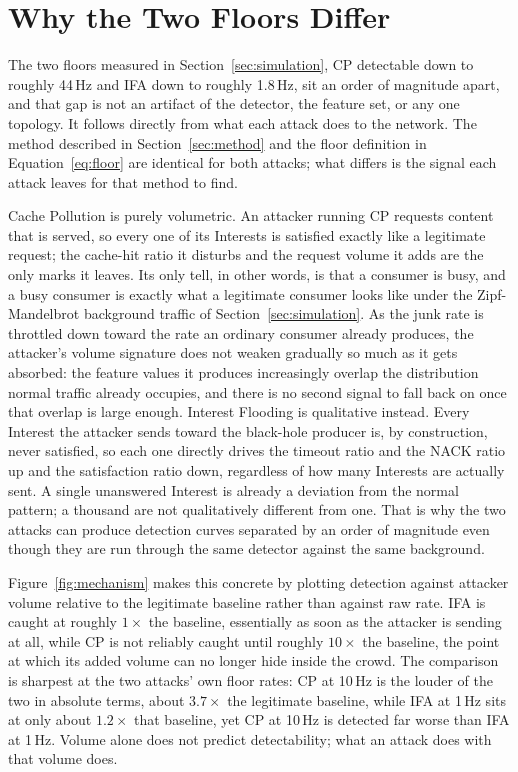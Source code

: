 \section{Why the Two Floors Differ}
\label{sec:mechanism}

The two floors measured in Section~\ref{sec:simulation}, CP detectable down to roughly 44\,Hz and IFA down to roughly 1.8\,Hz, sit an order of magnitude apart, and that gap is not an artifact of the detector, the feature set, or any one topology. It follows directly from what each attack does to the network. The method described in Section~\ref{sec:method} and the floor definition in Equation~\ref{eq:floor} are identical for both attacks; what differs is the signal each attack leaves for that method to find.

Cache Pollution is purely volumetric. An attacker running CP requests content that is served, so every one of its Interests is satisfied exactly like a legitimate request; the cache-hit ratio it disturbs and the request volume it adds are the only marks it leaves. Its only tell, in other words, is that a consumer is busy, and a busy consumer is exactly what a legitimate consumer looks like under the Zipf-Mandelbrot background traffic of Section~\ref{sec:simulation}. As the junk rate is throttled down toward the rate an ordinary consumer already produces, the attacker's volume signature does not weaken gradually so much as it gets absorbed: the feature values it produces increasingly overlap the distribution normal traffic already occupies, and there is no second signal to fall back on once that overlap is large enough. Interest Flooding is qualitative instead. Every Interest the attacker sends toward the black-hole producer is, by construction, never satisfied, so each one directly drives the timeout ratio and the NACK ratio up and the satisfaction ratio down, regardless of how many Interests are actually sent. A single unanswered Interest is already a deviation from the normal pattern; a thousand are not qualitatively different from one. That is why the two attacks can produce detection curves separated by an order of magnitude even though they are run through the same detector against the same background.

Figure~\ref{fig:mechanism} makes this concrete by plotting detection against attacker volume relative to the legitimate baseline rather than against raw rate. IFA is caught at roughly $1\times$ the baseline, essentially as soon as the attacker is sending at all, while CP is not reliably caught until roughly $10\times$ the baseline, the point at which its added volume can no longer hide inside the crowd. The comparison is sharpest at the two attacks' own floor rates: CP at 10\,Hz is the louder of the two in absolute terms, about $3.7\times$ the legitimate baseline, while IFA at 1\,Hz sits at only about $1.2\times$ that baseline, yet CP at 10\,Hz is detected far worse than IFA at 1\,Hz. Volume alone does not predict detectability; what an attack does with that volume does.

